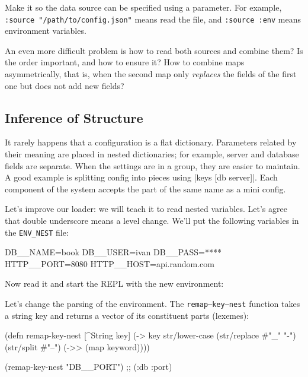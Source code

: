 Make it so the data source can be specified using a parameter. For example, \verb|:source "/path/to/config.json"| means read the file, and \verb|:source :env| means environment variables.


An even more difficult problem is how to read both sources and combine them? Is
the order important, and how to ensure it? How to combine maps asymmetrically,
that is, when the second map only \emph{replaces} the fields of the first one
but does not add new fields?

\subsection{Inference of Structure}


It rarely happens that a configuration is a flat dictionary. Parameters related by their meaning are placed in nested dictionaries; for example, server and database fields are separate. When the settings are in a group, they are easier to maintain. A good example is splitting config into pieces using \spverb|{keys [db server]}|. Each component of the system accepts the part of the same name as a mini config.

Let's improve our loader: we will teach it to read nested variables. Let's agree that double underscore means a level change. We'll put the following variables
in the \verb|ENV_NEST| file:

\begin{bash}
DB__NAME=book
DB__USER=ivan
DB__PASS=****
HTTP__PORT=8080
HTTP__HOST=api.random.com
\end{bash}


\noindent
Now read it and start the REPL with the new environment:


Let's change the parsing of the environment. The \texttt{remap--key--nest} function takes a string key and returns a vector of its constituent parts (lexemes):

\begin{clojure}
(defn remap-key-nest
  [^String key]
  (-> key
      str/lower-case
      (str/replace #"_" "-")
      (str/split #"--")
      (->> (map keyword))))

(remap-key-nest "DB__PORT")
;; (:db :port)
\end{clojure}

